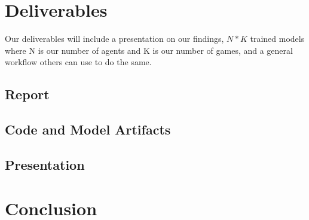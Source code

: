 \documentclass[conference]{IEEEtran}
\begin{document}
\section{Deliverables}
Our deliverables will include a presentation on our findings, $N*K$ trained models where N is our number of agents and K is our number of games, and a general workflow others can use to do the same.

\subsection{Report}

\subsection{Code and Model Artifacts}

\subsection{Presentation}

\section{Conclusion}

{}


\vspace{12pt}
\end{document}
